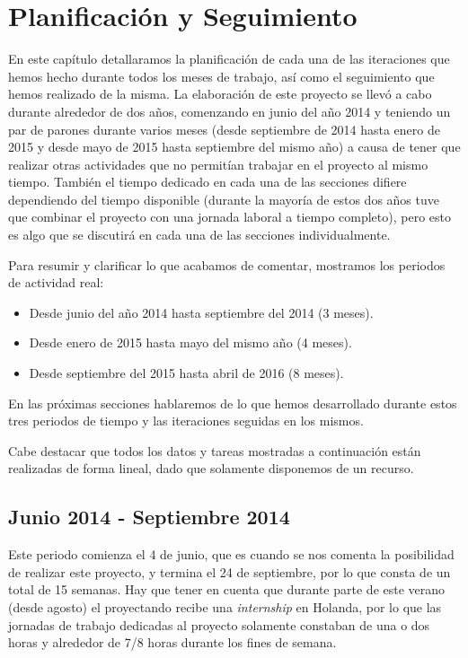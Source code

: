 \chapter{Planificación y Seguimiento}

En este capítulo detallaramos la planificación de cada una de las iteraciones que hemos hecho durante todos los meses de trabajo, así como el seguimiento que hemos realizado de la misma. La elaboración de este proyecto se llevó a cabo durante alrededor de dos años, comenzando en junio del año 2014 y teniendo un par de parones durante varios meses (desde septiembre de 2014 hasta enero de 2015 y desde mayo de 2015 hasta septiembre del mismo año) a causa de tener que realizar otras actividades que no permitían trabajar en el proyecto al mismo tiempo. También el tiempo dedicado en cada una de las secciones difiere dependiendo del tiempo disponible (durante la mayoría de estos dos años tuve que combinar el proyecto con una jornada laboral a tiempo completo), pero esto es algo que se discutirá en cada una de las secciones individualmente.

Para resumir y clarificar lo que acabamos de comentar, mostramos los periodos de actividad real:

\begin{itemize}
  \item Desde junio del año 2014 hasta septiembre del 2014 (3 meses).
  \item Desde enero de 2015 hasta mayo del mismo año (4 meses).
  \item Desde septiembre del 2015 hasta abril de 2016 (8 meses).
\end{itemize}

\noindent En las próximas secciones hablaremos de lo que hemos desarrollado durante estos tres periodos de tiempo y las iteraciones seguidas en los mismos.

Cabe destacar que todos los datos y tareas mostradas a continuación están realizadas de forma lineal, dado que solamente disponemos de un recurso.

\section{Junio 2014 - Septiembre 2014}

Este periodo comienza el 4 de junio, que es cuando se nos comenta la posibilidad de realizar este proyecto, y termina el 24 de septiembre, por lo que consta de un total de 15 semanas. Hay que tener en cuenta que durante parte de este verano (desde agosto) el proyectando recibe una \textit{internship} en Holanda, por lo que las jornadas de trabajo dedicadas al proyecto solamente constaban de una o dos horas y alrededor de 7/8 horas durante los fines de semana.

